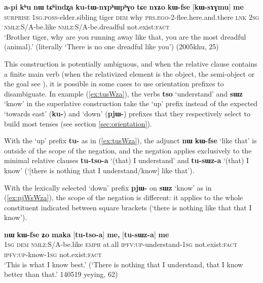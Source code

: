 \documentclass[oneside,a4paper,11pt]{article}
\newcommand{\ipa}[1]{{\phon\textbf{#1}}}
\newcommand{\forme}[2]{\ipa{#1} `#2'}
\begin{document}
 \begin{exe}
\ex \label{ex:kWfse.me}
\gll \ipa{ama} 	\ipa{a-pi} 	\ipa{kʰu} 	\ipa{nɯ} 	\ipa{tɕʰindʐa} 	\ipa{ku-tɯ-nɤpʰɯpʰɣo} 	\ipa{tɕe}  \ipa{nɤʑo} 	\ipa{kɯ-fse} 	[\ipa{kɯ-sɤɣmu}] 	\ipa{me} 	\\
\textsc{surprise} \textsc{1sg.poss}-elder.sibling tiger \textsc{dem} why \textsc{prs.ego}-2-flee.here.and.there \textsc{lnk} \textsc{2sg}  \textsc{nmlz}:S/A-be.like   \textsc{nmlz}:S/A-be.dreadful  not.exist:\textsc{fact} \\
\glt `Brother tiger, why are you running away like that, you are the most dreadful (animal).' (literally `There is no one dreadful like you') (2005khu, 25)
\end{exe}

This construction is potentially ambiguous, and when the relative clause contains a finite main verb (when the relativized element is the object, the semi-object or the goal see \citealt{jacques16relatives}), it is possible in some cases to use orientation prefixes to disambiguate. In example (\ref{ex:tusWza}), the verbs \forme{tso}{understand} and \forme{sɯz}{know} in the superlative construction take the `up' prefix instead of the expected `towards east' (\ipa{ku-}) and `down' (\ipa{pjɯ-}) prefixes that they respectively select to build most tenses (see section \ref{sec:orientation}).

With the `up' prefix \ipa{tu-} as in (\ref{ex:tusWza}), the adjunct \ipa{nɯ} \ipa{kɯ-fse} `like that' is outside of the scope of the negation, and the negation applies exclusively to the minimal relative clauses \ipa{tu-tso-a} `(that) I understand' and \ipa{tu-sɯz-a} `(that) I know' (`[there is nothing that I understand/know] like that').

With the lexically selected `down' prefix \ipa{pjɯ-} on \forme{sɯz}{know} as in (\ref{ex:pjWsWza}), the scope of the negation is different: it applies to the whole constituent indicated between square brackets (`there is nothing like that that I know').
 
\begin{exe}
\ex \label{ex:tusWza}
\gll \ipa{aʑo} 	\ipa{nɯ} 	\ipa{kɯ-fse} 	\ipa{ʑo} 	\ipa{maka} [\ipa{tu-tso-a}] 	\ipa{me,} [\ipa{tu-sɯz-a}] 	\ipa{me} \\
\textsc{1sg} \textsc{dem} \textsc{nmlz}:S/A-be.like \textsc{emph} at.all \textsc{ipfv:up}-understand-\textsc{1sg} not.exist:\textsc{fact} \textsc{ipfv:up}-know-\textsc{1sg} not.exist:\textsc{fact} \\
\glt `This is what I know best.' (`There is nothing that I understand, that I know better than that.' 140519 yeying, 62)
\end{exe}
\end{document}
